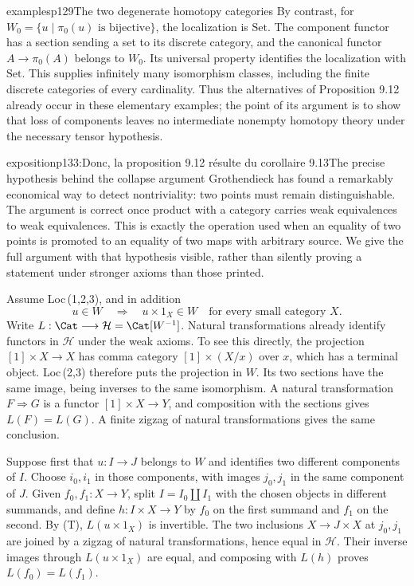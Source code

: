\begin{dcomment}{examples}{p129}{The two degenerate homotopy categories}
By contrast, for $W_0=\{u\mid\pi_0(u)\text{ is bijective}\}$, the localization is $\mathrm{Set}$. The component functor has a section sending a set to its discrete category, and the canonical functor $A\longrightarrow\pi_0(A)$ belongs to $W_0$. Its universal property identifies the localization with $\mathrm{Set}$. This supplies infinitely many isomorphism classes, including the finite discrete categories of every cardinality. Thus the alternatives of Proposition 9.12 already occur in these elementary examples; the point of its argument is to show that loss of components leaves no intermediate nonempty homotopy theory under the necessary tensor hypothesis.
\end{dcomment}

\begin{dcomment}{exposition}{p133:Donc, la proposition 9.12 résulte du corollaire 9.13}{The precise hypothesis behind the collapse argument}
Grothendieck has found a remarkably economical way to detect nontriviality: two points must remain distinguishable. The argument is correct once product with a category carries weak equivalences to weak equivalences. This is exactly the operation used when an equality of two points is promoted to an equality of two maps with arbitrary source. We give the full argument with that hypothesis visible, rather than silently proving a statement under stronger axioms than those printed.

Assume Loc\,(1,2,3), and in addition
\[
 u\in W\quad\Longrightarrow\quad u\times1_X\in W
 \quad\text{for every small category }X.\tag{T}
\]
Write $L:\Cat\longrightarrow\mathcal H=\Cat[W^{-1}]$. Natural transformations already identify functors in $\mathcal H$ under the weak axioms. To see this directly, the projection $[1]\times X\longrightarrow X$ has comma category $[1]\times(X/x)$ over $x$, which has a terminal object. Loc\,(2,3) therefore puts the projection in $W$. Its two sections have the same image, being inverses to the same isomorphism. A natural transformation $F\Rightarrow G$ is a functor $[1]\times X\longrightarrow Y$, and composition with the sections gives $L(F)=L(G)$. A finite zigzag of natural transformations gives the same conclusion.

Suppose first that $u:I\longrightarrow J$ belongs to $W$ and identifies two different components of $I$. Choose $i_0,i_1$ in those components, with images $j_0,j_1$ in the same component of $J$. Given $f_0,f_1:X\longrightarrow Y$, split $I=I_0\amalg I_1$ with the chosen objects in different summands, and define $h:I\times X\longrightarrow Y$ by $f_0$ on the first summand and $f_1$ on the second. By (T), $L(u\times1_X)$ is invertible. The two inclusions $X\longrightarrow J\times X$ at $j_0,j_1$ are joined by a zigzag of natural transformations, hence equal in $\mathcal H$. Their inverse images through $L(u\times1_X)$ are equal, and composing with $L(h)$ proves $L(f_0)=L(f_1)$.


\end{dcomment}
